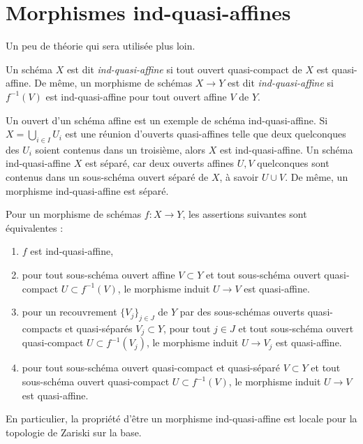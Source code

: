 \section{Morphismes ind-quasi-affines}
\label{section-ind-quasi-affine}

\noindent
Un peu de théorie qui sera utilisée plus loin.

\begin{definition}
\label{definition-ind-quasi-affine}
Un schéma $X$ est dit {\it ind-quasi-affine} si tout ouvert quasi-compact de
$X$ est quasi-affine. De même, un morphisme de schémas $X \to Y$
est dit {\it ind-quasi-affine} si $f^{-1}(V)$ est ind-quasi-affine
pour tout ouvert affine $V$ de $Y$.
\end{definition}

\noindent
Un ouvert d'un schéma affine est un exemple de schéma ind-quasi-affine.
Si $X = \bigcup_{i \in I} U_i$ est une réunion d'ouverts quasi-affines telle que
deux quelconques des $U_i$ soient contenus dans un troisième, alors $X$ est ind-quasi-affine.
Un schéma ind-quasi-affine $X$ est séparé, car deux ouverts affines
$U, V$ quelconques sont contenus dans un sous-schéma ouvert séparé de $X$, à savoir
$U \cup V$. De même, un morphisme ind-quasi-affine est séparé.

\begin{lemma}
\label{lemma-ind-quasi-affine-alternative-definition}
Pour un morphisme de schémas $f : X \to Y$, les assertions suivantes sont équivalentes :
\begin{enumerate}
\item $f$ est ind-quasi-affine,
\item pour tout sous-schéma ouvert affine $V \subset Y$ et
tout sous-schéma ouvert quasi-compact $U \subset f^{-1}(V)$,
le morphisme induit $U \to V$ est quasi-affine.
\item
pour un recouvrement $\{ V_j \}_{j \in J}$ de $Y$ par des sous-schémas
ouverts quasi-compacts et quasi-séparés
$V_j \subset Y$, pour tout $j \in J$ et tout sous-schéma
ouvert quasi-compact $U \subset f^{-1}(V_j)$, le morphisme induit
$U \to V_j$ est quasi-affine.
\item pour tout sous-schéma ouvert quasi-compact et quasi-séparé
$V \subset Y$ et tout sous-schéma ouvert quasi-compact
$U \subset f^{-1}(V)$, le morphisme induit $U \to V$ est quasi-affine.
\end{enumerate}
En particulier, la propriété d'être un morphisme ind-quasi-affine
est locale pour la topologie de Zariski sur la base.
\end{lemma}

